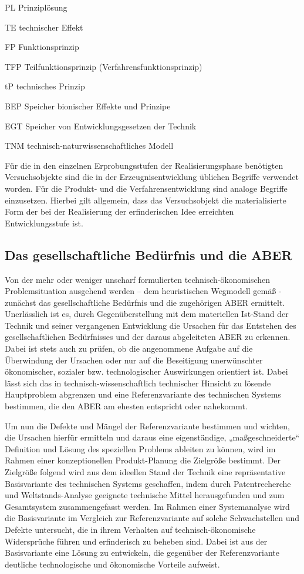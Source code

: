 \documentclass[12pt,a4paper]{article}
\begin{document}
PL              Prinziplösung

TE              technischer Effekt

FP              Funktionsprinzip

TFP            Teilfunktionsprinzip (Verfahrensfunktionsprinzip)

tP                technisches Prinzip

BEP            Speicher bionischer Effekte und Prinzipe

EGT            Speicher von Entwicklungsgesetzen der Technik

TNM            technisch-naturwissenschaftliches Modell


Für die in den einzelnen Erprobungsstufen der Realisierungsphase benötigten
Versuchsobjekte sind die in der Erzeugnisentwicklung üblichen Begriffe
verwendet worden. Für die Produkt- und die Verfahrensentwicklung sind analoge
Begriffe einzusetzen. Hierbei gilt allgemein, dass das Versuchsobjekt die
materialisierte Form der bei der Realisierung der erfinderischen Idee
erreichten Entwicklungsstufe ist.

\subsection{Das gesellschaftliche Bedürfnis und die ABER}

Von der mehr oder weniger unscharf formulierten technisch-ökonomischen
Problemsituation ausgehend werden -- dem heuristischen Wegmodell gemäß -
zunächst das gesellschaftliche Bedürfnis und die zugehörigen ABER
ermittelt. Unerlässlich ist es, durch Gegenüberstellung mit dem materiellen
Ist-Stand der Technik und seiner vergangenen Entwicklung die Ursachen für das
Entstehen des gesellschaftlichen Bedürfnisses und der daraus abgeleiteten ABER
zu erkennen. Dabei ist stets auch zu prüfen, ob die angenommene Aufgabe auf
die Überwindung der Ursachen oder nur auf die Beseitigung unerwünschter
ökonomischer, sozialer bzw. technologischer Auswirkungen orientiert ist. Dabei
lässt sich das in technisch-wissenschaftlich technischer Hinsicht zu lösende
Hauptproblem abgrenzen und eine Referenzvariante des technischen Systems
bestimmen, die den ABER am ehesten entspricht oder nahekommt.

Um nun die Defekte und Mängel der Referenzvariante bestimmen und wichten, die
Ursachen hierfür ermitteln und daraus eine eigenständige, „maßgeschneiderte“
Definition und Lösung des speziellen Problems ableiten zu können, wird im
Rahmen einer konzeptionellen Produkt-Planung die Zielgröße bestimmt. Der
Zielgröße folgend wird aus dem ideellen Stand der Technik eine repräsentative
Basisvariante des technischen Systems geschaffen, indem durch Patentrecherche
und Weltstands-Analyse geeignete technische Mittel herausgefunden und zum
Gesamtsystem zusammengefasst werden. Im Rahmen einer Systemanalyse wird die
Basisvariante im Vergleich zur Referenzvariante auf solche Schwachstellen und
Defekte untersucht, die in ihrem Verhalten auf technisch-ökonomische
Widersprüche führen und erfinderisch zu beheben sind. Dabei ist aus der
Basisvariante eine Lösung zu entwickeln, die gegenüber der Referenzvariante
deutliche technologische und ökonomische Vorteile aufweist.
\end{document}
